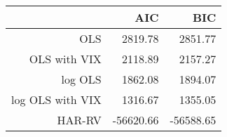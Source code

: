 \begin{table}[ht]
\centering
\begin{tabular}{rrr}
  \hline
 & AIC & BIC \\ 
  \hline
OLS & 2819.78 & 2851.77 \\ 
  OLS with VIX & 2118.89 & 2157.27 \\ 
  log OLS & 1862.08 & 1894.07 \\ 
  log OLS with VIX & 1316.67 & 1355.05 \\ 
  HAR-RV & -56620.66 & -56588.65 \\ 
   \hline
\end{tabular}
\end{table}
